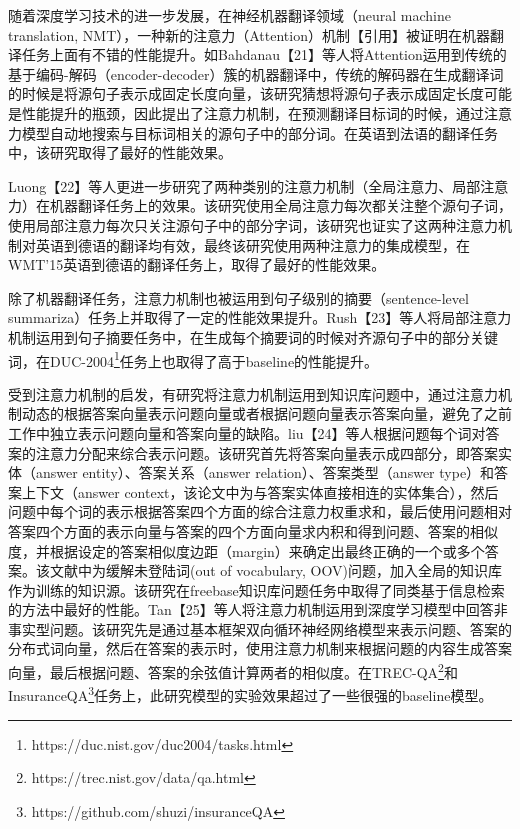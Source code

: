 随着深度学习技术的进一步发展，在神经机器翻译领域（neural machine translation, NMT），一种新的注意力（Attention）机制【引用】被证明在机器翻译任务上面有不错的性能提升。如Bahdanau\cite{Bahdanau}【21】等人将Attention运用到传统的基于编码-解码（encoder-decoder）簇的机器翻译中，传统的解码器在生成翻译词的时候是将源句子表示成固定长度向量，该研究猜想将源句子表示成固定长度可能是性能提升的瓶颈，因此提出了注意力机制，在预测翻译目标词的时候，通过注意力模型自动地搜索与目标词相关的源句子中的部分词。在英语到法语的翻译任务中，该研究取得了最好的性能效果。

Luong\cite{Luong}【22】等人更进一步研究了两种类别的注意力机制（全局注意力、局部注意力）在机器翻译任务上的效果。该研究使用全局注意力每次都关注整个源句子词，使用局部注意力每次只关注源句子中的部分字词，该研究也证实了这两种注意力机制对英语到德语的翻译均有效，最终该研究使用两种注意力的集成模型，在WMT'15英语到德语的翻译任务上，取得了最好的性能效果。

除了机器翻译任务，注意力机制也被运用到句子级别的摘要（sentence-level summariza）任务上并取得了一定的性能效果提升。Rush\cite{Rush}【23】等人将局部注意力机制运用到句子摘要任务中，在生成每个摘要词的时候对齐源句子中的部分关键词，在DUC-2004\footnote{https://duc.nist.gov/duc2004/tasks.html}任务上也取得了高于baseline的性能提升。

受到注意力机制的启发，有研究将注意力机制运用到知识库问题中，通过注意力机制动态的根据答案向量表示问题向量或者根据问题向量表示答案向量，避免了之前工作中独立表示问题向量和答案向量的缺陷。liu\cite{Liu}【24】等人根据问题每个词对答案的注意力分配来综合表示问题。该研究首先将答案向量表示成四部分，即答案实体（answer entity）、答案关系（answer relation）、答案类型（answer type）和答案上下文（answer context，该论文中为与答案实体直接相连的实体集合），然后问题中每个词的表示根据答案四个方面的综合注意力权重求和，最后使用问题相对答案四个方面的表示向量与答案的四个方面向量求内积和得到问题、答案的相似度，并根据设定的答案相似度边距（margin）来确定出最终正确的一个或多个答案。该文献中为缓解未登陆词(out of vocabulary, OOV)问题，加入全局的知识库作为训练的知识源。该研究在freebase知识库问题任务中取得了同类基于信息检索的方法中最好的性能。Tan\cite{Tan}【25】等人将注意力机制运用到深度学习模型中回答非事实型问题。该研究先是通过基本框架双向循环神经网络模型来表示问题、答案的分布式词向量，然后在答案的表示时，使用注意力机制来根据问题的内容生成答案向量，最后根据问题、答案的余弦值计算两者的相似度。在TREC-QA\footnote{https://trec.nist.gov/data/qa.html}和InsuranceQA\footnote{https://github.com/shuzi/insuranceQA}任务上，此研究模型的实验效果超过了一些很强的baseline模型。

